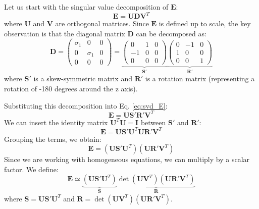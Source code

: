 \documentclass[11pt,a4paper]{article}
\theoremstyle{definition}
\theoremstyle{plain}
\theoremstyle{remark}
\begin{document}
Let us start with the singular value decomposition of $\mathbf{E}$:
\begin{equation} \label{eq:svd_E}
    \mathbf{E} = \mathbf{U} \mathbf{D} \mathbf{V}^T
\end{equation}
where $\mathbf{U}$ and $\mathbf{V}$ are orthogonal matrices. Since $\mathbf{E}$ is defined up to scale, the key observation is that the diagonal matrix $\mathbf{D}$ can be decomposed as:
\begin{equation} \label{eq:D_decomposition}
    \mathbf{D} = \begin{pmatrix}
    \sigma_1 & 0 & 0 \\
    0 & \sigma_1 & 0 \\
    0 & 0 & 0
    \end{pmatrix}
    = \underbrace{\begin{pmatrix}
        0 & 1 & 0 \\
        -1 & 0 & 0 \\
        0 & 0 & 0
    \end{pmatrix}}_{\mathbf{S'}} \underbrace{
    \begin{pmatrix}
        0 & -1 & 0 \\
        1 & 0 & 0 \\
        0 & 0 & 1
    \end{pmatrix}}_{\mathbf{R'}}
\end{equation}
where $\mathbf{S'}$ is a skew-symmetric matrix and $\mathbf{R'}$ is a rotation matrix (representing a rotation of -180 degrees around the z axis).

Substituting this decomposition into Eq. \eqref{eq:svd_E}:
\begin{equation} \nonumber
    \mathbf{E} = \mathbf{U} \mathbf{S'} \mathbf{R'} \mathbf{V}^T
\end{equation}
We can insert the identity matrix $\mathbf{U}^T \mathbf{U} = \mathbf{I}$ between $\mathbf{S'}$ and $\mathbf{R'}$:
\begin{equation} \nonumber
    \mathbf{E} = \mathbf{U} \mathbf{S'} \mathbf{U}^T \mathbf{U} \mathbf{R'} \mathbf{V}^T
\end{equation}
Grouping the terms, we obtain:
\begin{equation} \nonumber
    \mathbf{E} = (\mathbf{U} \mathbf{S'} \mathbf{U}^T) (\mathbf{U} \mathbf{R'} \mathbf{V}^T)
\end{equation}
Since we are working with homogeneous equations, we can multiply by a scalar factor. We define:
\begin{equation} \label{eq:S_R_def}
    \mathbf{E} \simeq  \underbrace{(\mathbf{U} \mathbf{S'} \mathbf{U}^T)}_{\mathbf{S}} \underbrace{\det(\mathbf{U} \mathbf{V}^{T}) (\mathbf{U} \mathbf{R'} \mathbf{V}^T)}_{\mathbf{R}}
\end{equation}
where $\mathbf{S} = \mathbf{U} \mathbf{S'} \mathbf{U}^T$ and $\mathbf{R} = \det(\mathbf{U} \mathbf{V}^{T}) (\mathbf{U} \mathbf{R'} \mathbf{V}^T)$.
\end{document}
